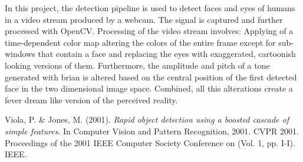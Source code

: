 \documentclass[11pt,a4paper]{article}
\begin{document}
In this project, the detection pipeline is used to detect faces and eyes of humans in a video stream produced by a webcam. The signal is captured and further processed with OpenCV. Processing of the video stream involves: Applying of a time-dependent color map altering the colors of the entire frame except for sub-windows that contain a face and replacing the eyes with exaggerated, cartoonish looking versions of them. Furthermore, the amplitude and pitch of a  tone generated with brian is altered based on the central position of the first detected face in the two dimensional image space. Combined, all this alterations create a fever dream like version of the perceived reality.

\vfill

\begin{thebibliography}{9}

    Viola, P. \& Jones, M. (2001). \emph{Rapid object detection using a boosted cascade of simple features}. In Computer Vision and Pattern Recognition, 2001. CVPR 2001. Proceedings of the 2001 IEEE Computer Society Conference on (Vol. 1, pp. I-I). IEEE.

\end{thebibliography}
\end{document}
